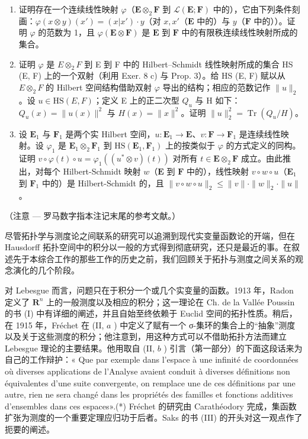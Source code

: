 \begin{enumerate}
\def\labelenumi{\alph{enumi})}
\item
  证明存在一个连续线性映射 \(\varphi\)（\(\mathbf{E} \otimes_2 \mathbf{F}\) 到 \(\mathcal{L}(\mathbf{E}; \mathbf{F})\) 中的），它由下列条件刻画：\(\varphi(x \otimes y)(x') = (x|x') \cdot y\)（对 \(x, x'\)（\(\mathbf{E}\) 中的）与 \(y\)（\(\mathbf{F}\) 中的））。证明 \(\varphi\) 的范数为 1，且 \(\varphi(\mathbf{E} \otimes \mathbf{F})\) 是 \(\mathbf{E}\) 到 \(\mathbf{F}\) 中的有限秩连续线性映射所成的集合。
\item
  证明 \(\varphi\) 是 \(E \otimes_2 F\) 到 E 到 F 中的 Hilbert--Schmidt 线性映射所成的集合 HS (E, F) 上的一个双射（利用 Exer. 8 c) 与 Prop. 3）。给 HS (E, F) 赋以从 \(E \otimes_2 F\) 的 Hilbert 空间结构借助双射 \(\varphi\) 导出的结构；相应的范数记作 \(\|u\|_2\)。设 \(u \in \mathrm{HS}(E, F)\)；定义 E 上的正二次型 \(Q_u\) 与 H 如下：\(Q_u(x) = \|u(x)\|^2\) 与 \(H(x) = \|x\|^2\)。证明 \(\|u\|_2^2 = \operatorname{Tr}(Q_u / H)\)。
\item
  设 \(\mathbf{E}_1\) 与 \(\mathbf{F}_1\) 是两个实 Hilbert 空间，\(u: \mathbf{E}_1 \to \mathbf{E}\)、\(v: \mathbf{F} \to \mathbf{F}_1\) 是连续线性映射。设 \(\varphi_1\) 是 \(\mathbf{E}_1 \otimes_2 \mathbf{F}_1\) 到 \(\mathrm{HS}(\mathbf{E}_1, \mathbf{F}_1)\) 上的按类似于 \(\varphi\) 的方式定义的同构。证明 \(v \circ \varphi(t) \circ u = \varphi_1((u^* \otimes v)(t))\) 对所有 \(t \in \mathbf{E} \otimes_2 \mathbf{F}\) 成立。由此推出，对每个 Hilbert-Schmidt 映射 \(w\)（\(\mathbf{E}\) 到 \(\mathbf{F}\) 中的），线性映射 \(v \circ w \circ u\)（\(\mathbf{E}_1\) 到 \(\mathbf{F}_1\) 中的）是 Hilbert-Schmidt 的，且 \(\|v \circ w \circ u\|_2 \leqslant \|v\| \cdot \|w\|_2 \cdot \|u\|\)。
\end{enumerate}


（注意 --- 罗马数字指本注记末尾的参考文献。）

尽管拓扑学与测度论之间联系的研究可以追溯到现代实变量函数论的开端，但在 Hausdorff 拓扑空间中的积分以一般的方式得到彻底研究，还只是最近的事。在叙述先于本综合工作的那些工作的历史之前，我们回顾关于拓扑与测度之间关系的观念演化的几个阶段。

对 Lebesgue 而言，问题只在于积分一个或几个实变量的函数。1913 年，Radon 定义了 \(\mathbf{R}^n\) 上的一般测度以及相应的积分；这一理论在 Ch. de la Vallée Poussin 的书 (I) 中有详细的阐述，并且自始至终依赖于 Euclid 空间的拓扑性质。稍后，在 1915 年，Fréchet 在 (II, \(a\) ) 中定义了赋有一个 σ-集环的集合上的“抽象”测度以及关于这些测度的积分；他注意到，用这种方式可以不借助拓扑方法而建立 Lebesgue 理论的主要结果。他用取自 (II, \(b\) ) 引言（第一部分）的下面这段话来为自己的工作辩护：« Que par exemple dans l'espace à une infinité de coordonnées où diverses applications de l'Analyse avaient conduit à diverses définitions non équivalentes d'une suite convergente, on remplace une de ces définitions par une autre, rien ne sera changé dans les propriétés des familles et fonctions additives d'ensembles dans ces espaces».(*) Fréchet 的研究由 Carathéodory 完成，集函数扩张为测度的一个重要定理应归功于后者。Saks 的书 (III) 的开头对这一观点作了扼要的阐述。

